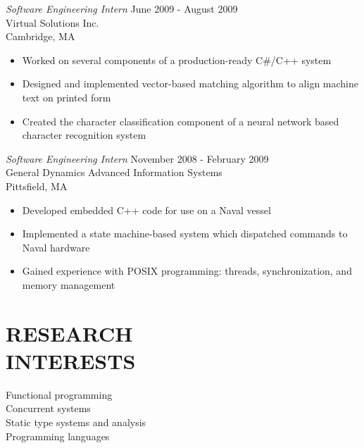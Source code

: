 \documentclass[margin]{res}
\begin{document}
\begin{resume}
                {\sl Software Engineering Intern} \hfill            June 2009 - August 2009 \\
                Virtual Solutions Inc. \\ 
                Cambridge, MA
                 \begin{itemize}  \itemsep -2pt %
                  \item Worked on several components of a production-ready C\#/C++ system
                  \item Designed and implemented vector-based matching algorithm to align machine text on printed form
                  \item Created the character classification component of a 
                    neural network based character recognition system
                 \end{itemize} 
                {\sl Software Engineering Intern} \hfill        November 2008 - February 2009 \\
                General Dynamics Advanced Information Systems \\
                Pittsfield, MA
                  \begin{itemize}  \itemsep -2pt
                   \item Developed embedded C++ code for use on a Naval vessel
                   \item Implemented a state machine-based system which dispatched commands to Naval hardware
                   \item Gained experience with POSIX programming: threads, synchronization, and memory management
                  \end{itemize} 

\section{RESEARCH \\ INTERESTS}             
                 Functional programming \\
                 Concurrent systems \\
                 Static type systems and analysis \\
                 Programming languages
\end{resume}
\end{document}
